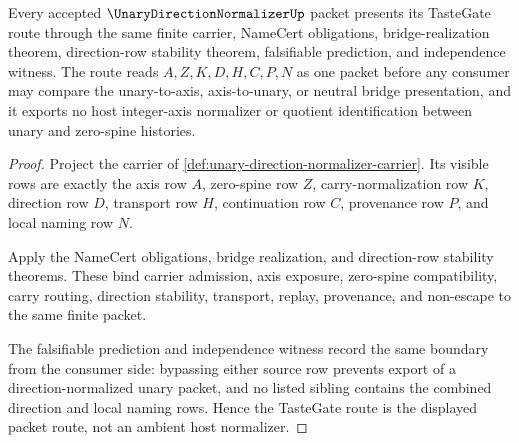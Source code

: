 

\begin{theorem}
\label{thm:unary-direction-normalizer-tastegate-route}
Every accepted $\UnaryDirectionNormalizerUp$ packet presents its TasteGate route through the same finite carrier, NameCert obligations, bridge-realization theorem, direction-row stability theorem, falsifiable prediction, and independence witness. The route reads $A,Z,K,D,H,C,P,N$ as one packet before any consumer may compare the unary-to-axis, axis-to-unary, or neutral bridge presentation, and it exports no host integer-axis normalizer or quotient identification between unary and zero-spine histories.
\end{theorem}
\begin{proof}
Project the carrier of \autoref{def:unary-direction-normalizer-carrier}. Its visible rows are exactly the axis row $A$, zero-spine row $Z$, carry-normalization row $K$, direction row $D$, transport row $H$, continuation row $C$, provenance row $P$, and local naming row $N$.

Apply the NameCert obligations, bridge realization, and direction-row stability theorems. These bind carrier admission, axis exposure, zero-spine compatibility, carry routing, direction stability, transport, replay, provenance, and non-escape to the same finite packet.

The falsifiable prediction and independence witness record the same boundary from the consumer side: bypassing either source row prevents export of a direction-normalized unary packet, and no listed sibling contains the combined direction and local naming rows. Hence the TasteGate route is the displayed packet route, not an ambient host normalizer.
\end{proof}


